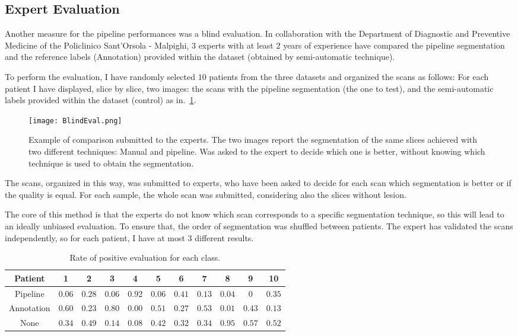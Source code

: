 \documentclass{standalone}
\begin{document}
	\subsection{Expert Evaluation}
	
	Another measure for the pipeline performances was a blind evaluation. In collaboration with the Department of Diagnostic and Preventive Medicine of the Policlinico Sant'Orsola - Malpighi, $3$ experts with at least $2$ years of experience have compared the pipeline segmentation and the reference labels (Annotation) provided within the dataset (obtained by semi-automatic technique). 

	To perform the evaluation, I have randomly selected $10$ patients from the three datasets and organized the scans as follows:
	For each patient I have displayed, slice by slice, two images: the scans with the pipeline segmentation (the one to test), and the semi-automatic labels provided within the dataset (control) as in. \figurename\,\ref{fig:Blind}.
	
	\begin{figure}[h!]
		\centering
		\texttt{[image: BlindEval.png]}
		\caption{Example of comparison submitted to the experts. The two images report the segmentation of the same slices achieved with two different techniques: Manual and pipeline. Was asked to the expert to decide which one is better, without knowing which technique is used to obtain the segmentation.}\label{fig:Blind}
	\end{figure}

	The scans, organized in this way, was submitted to experts, who have been asked to decide for each scan which segmentation is better or if the quality is equal. For each sample, the whole scan was submitted, considering also the slices without lesion. 

	The core of this method is that the experts do not know which scan corresponds to a specific segmentation technique, so this will lead to an ideally unbiased evaluation. To ensure that, the order of segmentation was shuffled between patients. The expert has validated the scans independently, so for each patient, I have at most $3$ different results. 

	\begin{table}[h!]
		\begin{tabular}{|c|c|c|c|c|c|c|c|c|c|c|}
			\hline
			Patient  	& 1  	 & 2  	  & 3  	   & 4    	& 5  	& 6   	 & 7  	  & 8  		& 9  	& 10	 \\ \hline
			Pipeline	& $0.06$ & $0.28$ & $0.06$ & $0.92$ & $0.06$& $0.41$ & $0.13$ & $0.04$  & $0$ 	& $0.35$ \\ 
			Annotation	& $0.60$ & $0.23$ & $0.80$ & $0.00$	& $0.51$& $0.27$ & $0.53$ & $0.01$  & $0.43$& $0.13$ \\ 
			None		& $0.34$ & $0.49$ & $0.14$ & $0.08$ & $0.42$& $0.32$ & $0.34$ & $0.95$	& $0.57$& $0.52$ \\ \hline
		\end{tabular}\caption{Rate of positive evaluation for each class.   }\label{tab:blind}
	\end{table}
\end{document}
